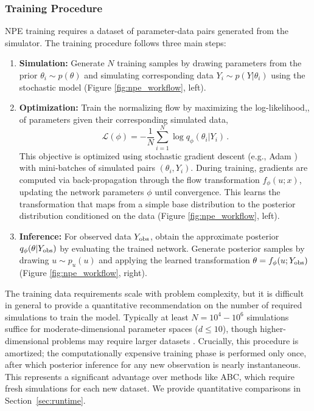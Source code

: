 \documentclass{article}
\begin{document}
\subsubsection{Training Procedure}

NPE training requires a dataset of parameter-data pairs generated from the simulator. The training procedure follows three main steps:

\begin{enumerate}
	\item \textbf{Simulation:} Generate $N$ training samples by drawing parameters from the prior $\theta_i \sim p(\theta)$ and simulating corresponding data $Y_i \sim p(Y|\theta_i)$ using the stochastic model (Figure \ref{fig:npe_workflow}, left).

	\item \textbf{Optimization:} Train the normalizing flow by maximizing the log-likelihood,, of parameters given their corresponding simulated data, 
	\begin{equation}
		\mathcal{L}(\phi) = -\frac{1}{N} \sum_{i=1}^N \log q_\phi(\theta_i | Y_i) \, .
	\end{equation}
This objective is optimized using stochastic gradient descent (e.g., Adam \citep{kingma2014adam}) with mini-batches of simulated pairs $(\theta_i, Y_i)$. During training, gradients are computed via back-propagation through the flow transformation $f_\phi(u; x)$, updating the network parameters $\phi$ until convergence. This learns the transformation that maps from a simple base distribution to the posterior distribution conditioned on the data (Figure \ref{fig:npe_workflow}, left).
	\item \textbf{Inference:} For observed data $Y_{\rm obs}$, obtain the approximate posterior $q_\phi(\theta | Y_{\rm obs})$ by evaluating the trained network. Generate posterior samples by drawing $u \sim p_u(u)$ and applying the learned transformation $\theta = f_\phi(u; Y_{\rm obs})$ (Figure \ref{fig:npe_workflow}, right).
\end{enumerate}
The training data requirements scale with problem complexity, but it is difficult in general to provide a quantitative recommendation on the number of required simulations to train the model. Typically at least $N = 10^4 - 10^6$ simulations suffice for moderate-dimensional parameter spaces ($d \leq 10$), though higher-dimensional problems may require larger datasets \citep{2025arXiv250812939D}. Crucially, this procedure is amortized; the computationally expensive training phase is performed only once, after which posterior inference for any new observation is nearly instantaneous. This represents a significant advantage over methods like ABC, which require fresh simulations for each new dataset. We provide quantitative comparisons in Section~\ref{sec:runtime}.
\end{document}
